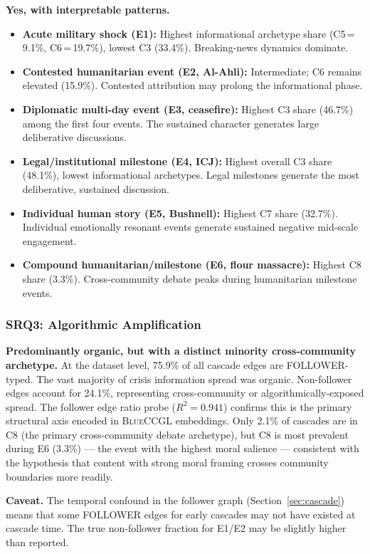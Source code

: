 \documentclass[12pt, a4paper]{article}
\newcommand{\BLUECCGL}{\textsc{BlueCCGL}\xspace}
\begin{document}
\textbf{Yes, with interpretable patterns.}
\begin{itemize}
  \item \textbf{Acute military shock (E1):} Highest informational archetype share (C5\,=\,9.1\%, C6\,=\,19.7\%), lowest C3 (33.4\%). Breaking-news dynamics dominate.
  \item \textbf{Contested humanitarian event (E2, Al-Ahli):} Intermediate; C6 remains elevated (15.9\%). Contested attribution may prolong the informational phase.
  \item \textbf{Diplomatic multi-day event (E3, ceasefire):} Highest C3 share (46.7\%) among the first four events. The sustained character generates large deliberative discussions.
  \item \textbf{Legal/institutional milestone (E4, ICJ):} Highest overall C3 share (48.1\%), lowest informational archetypes. Legal milestones generate the most deliberative, sustained discussion.
  \item \textbf{Individual human story (E5, Bushnell):} Highest C7 share (32.7\%). Individual emotionally resonant events generate sustained negative mid-scale engagement.
  \item \textbf{Compound humanitarian/milestone (E6, flour massacre):} Highest C8 share (3.3\%). Cross-community debate peaks during humanitarian milestone events.
\end{itemize}

\subsubsection*{SRQ3: Algorithmic Amplification}

\textbf{Predominantly organic, but with a distinct minority cross-community archetype.} At the dataset level, 75.9\% of all cascade edges are FOLLOWER-typed. The vast majority of crisis information spread was organic. Non-follower edges account for 24.1\%, representing cross-community or algorithmically-exposed spread. The follower edge ratio probe ($R^2 = 0.941$) confirms this is the primary structural axis encoded in \BLUECCGL embeddings. Only 2.1\% of cascades are in C8 (the primary cross-community debate archetype), but C8 is most prevalent during E6 (3.3\%) --- the event with the highest moral salience --- consistent with the hypothesis that content with strong moral framing crosses community boundaries more readily.

\textbf{Caveat.} The temporal confound in the follower graph (Section~\ref{sec:cascade}) means that some FOLLOWER edges for early cascades may not have existed at cascade time. The true non-follower fraction for E1/E2 may be slightly higher than reported.
\end{document}
